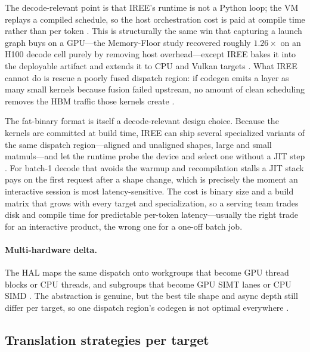 The decode-relevant point is that IREE's runtime is not a Python loop; the VM replays a compiled schedule, so the host orchestration cost is paid at compile time rather than per token \citep{iree2024,taxbreak2026}. This is structurally the same win that capturing a launch graph buys on a GPU---the Memory-Floor study recovered roughly $1.26\times$ on an H100 decode cell purely by removing host overhead---except IREE bakes it into the deployable artifact and extends it to CPU and Vulkan targets \citep{memoryfloor2026,nvidia2024cudagraphs}. What IREE cannot do is rescue a poorly fused dispatch region: if codegen emits a layer as many small kernels because fusion failed upstream, no amount of clean scheduling removes the HBM traffic those kernels create \citep{dao2022flashattention}.

The fat-binary format is itself a decode-relevant design choice. Because the kernels are committed at build time, IREE can ship several specialized variants of the same dispatch region---aligned and unaligned shapes, large and small matmuls---and let the runtime probe the device and select one without a JIT step \citep{iree2024}. For batch-1 decode that avoids the warmup and recompilation stalls a JIT stack pays on the first request after a shape change, which is precisely the moment an interactive session is most latency-sensitive. The cost is binary size and a build matrix that grows with every target and specialization, so a serving team trades disk and compile time for predictable per-token latency---usually the right trade for an interactive product, the wrong one for a one-off batch job.

\paragraph{Multi-hardware delta.} The HAL maps the same dispatch onto workgroups that become GPU thread blocks or CPU threads, and subgroups that become GPU SIMT lanes or CPU SIMD \citep{iree2024}. The abstraction is genuine, but the best tile shape and async depth still differ per target, so one dispatch region's codegen is not optimal everywhere \citep{semianalysis2024tma,nvidia2022hopper}.

\subsection{Translation strategies per target}

